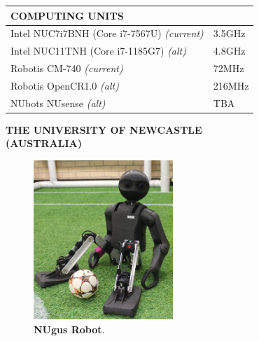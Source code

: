 \documentclass[10pt,a4paper]{article}
\begin{document}
\begin{multicols}{2}
\begin{table}[H]
	\begin{tabular}{|m{5.9cm}|m{1.25cm}|}
		\hline
		\rowcolor[rgb]{0.0, 0.0, 0.0}
		{\color{textcolour}\textbf{{COMPUTING UNITS}}} & \\
		\hline
		Intel NUC7i7BNH (Core i7-7567U) \textit{(current)} & 3.5GHz \\
		\hline
        Intel NUC11TNH (Core i7-1185G7) \textit{(alt)} & 4.8GHz \\
		\hline
		Robotis CM-740 \textit{(current)} & 72MHz \\
		\hline
        Robotis OpenCR1.0 \textit{(alt)} & 216MHz \\
		\hline
        NUbots NUsense \textit{(alt)} & TBA \\
		\hline
	\end{tabular}
\end{table}

\columnbreak

\begin{center}
	\colorbox[rgb]{0.0, 0.0, 0.0}
	{
	\begin{minipage}[c][3.5em][c]{0.45\textwidth}
		\begin{center}
			{\color{textcolour}
				{
				\textbf{THE UNIVERSITY OF NEWCASTLE \\
				(AUSTRALIA)}
				}
			}
		\end{center}
	\end{minipage}
	}
\end{center}

\begin{figure}[H]
	\begin{center}
		\includegraphics[width=0.47\textwidth]{Kev1}\\
		\textbf{NUgus Robot}.
	\end{center}
\end{figure}

\end{multicols}
\end{document}
